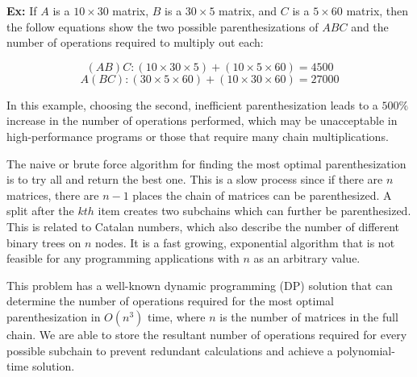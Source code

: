 \documentclass[conference,leqno]{IEEEtran}
\begin{document}
\textbf{Ex:} If $A$ is a $10\times30$ matrix, $B$ is a $30\times5$ matrix, and $C$ is a $5\times60$ matrix, then the follow equations show the two possible parenthesizations of $ABC$ and the number of operations required to multiply out each:

\begin{equation}
(AB)C: (10\times30\times5) + (10\times5\times60) = 4500
\end{equation}
\begin{equation}
A(BC): (30\times5\times60) + (10\times30\times60) = 27000
\end{equation}
\vspace{.1cm}

In this example, choosing the second, inefficient parenthesization leads to a $500\%$ increase in the number of operations performed, which may be unacceptable in high-performance programs or those that require many chain multiplications.

The naive or brute force algorithm for finding the most optimal parenthesization is to try all and return the best one. This is a slow process since if there are $n$ matrices, there are $n-1$ places the chain of matrices can be parenthesized. A split after the $kth$ item creates two subchains which can further be parenthesized. This is related to Catalan numbers, which also describe the number of different binary trees on $n$ nodes. It is a fast growing, exponential algorithm that is not feasible for any programming applications with $n$ as an arbitrary value.

This problem has a well-known dynamic programming (DP) solution that can determine the number of operations required for the most optimal parenthesization in $O(n^3)$ time, where $n$ is the number of matrices in the full chain. We are able to store the resultant number of operations required for every possible subchain to prevent redundant calculations and achieve a polynomial-time solution.
\end{document}
